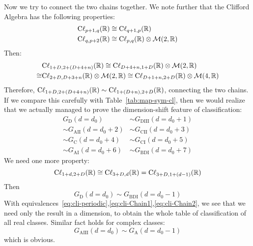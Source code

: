 Now we try to connect the two chains together. We note further that the
Clifford Algebra has the following properties:
\begin{align}
    \mathrm{C\ell}_{p+1,q}(\mathbb{R}) &\cong \mathrm{C\ell}_{q+1,p}(\mathbb{R}) \\
    \mathrm{C\ell}_{q,p+2}(\mathbb{R}) &\cong \mathrm{C\ell}_{p,q}(\mathbb{R}) \otimes\mathcal{M}(2,\mathbb{R})
\end{align}
Then:
\begin{align}
    &\mathrm{C\ell}_{1+D,2+(D+4+n)}(\mathbb{R}) \cong
    \mathrm{C\ell}_{D+4+n,1+D}(\mathbb{R})\otimes\mathcal{M}(2,\mathbb{R}) \nonumber\\
    \cong& \mathrm{C\ell}_{2+D,D+3+n}(\mathbb{R})\otimes\mathcal{M}(2,\mathbb{R})
    \cong \mathrm{C\ell}_{D+1+n,2+D}(\mathbb{R})\otimes\mathcal{M}(4,\mathbb{R})
\end{align}
Therefore,
$\mathrm{C\ell}_{1+D,2+(D+4+n)}(\mathbb{R})\sim\mathrm{C\ell}_{1+(D+n),2+D}(\mathbb{R})$,
connecting the two chains. If we compare this carefully with
Table~\ref{tab:map-sym-cl}, then we would realize that we actually managed to
prove the dimension-shift feature of classification:
\begin{align}
    \label{eq:cli-Chain1}
    G_{\mathrm{D}}(d=d_0) &\sim G_{\mathrm{DIII}}(d=d_0+1) \nonumber\\
    \sim G_{\mathrm{AII}}(d=d_0+2) &\sim G_{\mathrm{CII}}(d=d_0+3) \nonumber\\
    \sim G_{\mathrm{C}}(d=d_0+4) &\sim G_{\mathrm{CI}}(d=d_0+5) \nonumber\\
    \sim G_{\mathrm{AI}}(d=d_0+6) &\sim G_{\mathrm{BDI}}(d=d_0+7)
\end{align}
We need one more property:
\begin{equation}
    \mathrm{C\ell}_{1+d,2+D}(\mathbb{R})\cong
    \mathrm{C\ell}_{3+D,d}(\mathbb{R})=\mathrm{C\ell}_{3+D,1+(d-1)}(\mathbb{R})
\end{equation}
Then
\begin{equation}
    \label{eq:cli-Chain2}
    G_{\mathrm{D}}(d=d_0) \sim G_{\mathrm{BDI}}(d=d_0-1)
\end{equation}
With equivalences~\ref{eq:cli-periodic},\ref{eq:cli-Chain1},\ref{eq:cli-Chain2},
we see that we need only the result in a dimension, to obtain the whole table of
classification of all real classes. Similar fact holds for complex classes:
\begin{equation}
    G_{\mathrm{AIII}}(d=d_0) \sim G_{\mathrm{A}}(d=d_0-1)
\end{equation}
which is obvious. 


